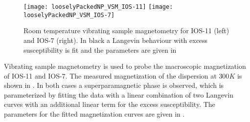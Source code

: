 \documentclass[\main/dresen_thesis.tex]{subfiles}
\begin{document}
  \label{sec:looselyPackedNS:nanoparticle:vsm}
  \begin{figure}[tb]
    \centering
    \texttt{[image: looselyPackedNP\_VSM\_IOS-11]}
    \texttt{[image: looselyPackedNP\_VSM\_IOS-7]}
    \caption{\label{fig:looselyPackedNP:nanoparticle:vsm}Room temperature vibrating sample magnetometry for IOS-11 (left) and IOS-7 (right). In black a Langevin behaviour with excess susceptibility is fit and the parameters are given in }
  \end{figure}

  Vibrating sample magnetometry is used to probe the macroscopic magnetization of IOS-11 and IOS-7.
  The measured magnetization of the dispersion at $300 \unit{K}$ is shown in .
  In both cases a superparamagnetic phase is observed, which is parameterized by fitting the data with a linear combination of two Langevin curves with an additional linear term for the excess susceptibility.
  The parameters for the fitted magnetization curves are given in .
\end{document}
